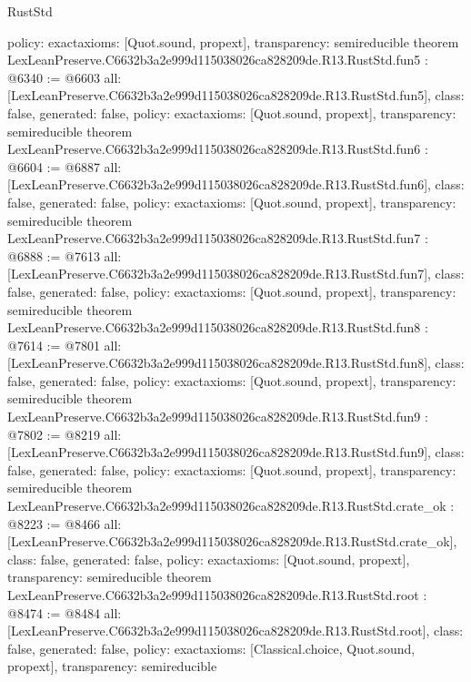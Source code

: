 \begin{lexlean}{RustStd}
\begin{coremodule}
{  policy: exact{axioms: [Quot.sound, propext]},
  transparency: semireducible
}
theorem LexLeanPreserve.C6632b3a2e999d115038026ca828209de.R13.RustStd.fun5 : @6340 := @6603 {
  all: [LexLeanPreserve.C6632b3a2e999d115038026ca828209de.R13.RustStd.fun5],
  class: false,
  generated: false,
  policy: exact{axioms: [Quot.sound, propext]},
  transparency: semireducible
}
theorem LexLeanPreserve.C6632b3a2e999d115038026ca828209de.R13.RustStd.fun6 : @6604 := @6887 {
  all: [LexLeanPreserve.C6632b3a2e999d115038026ca828209de.R13.RustStd.fun6],
  class: false,
  generated: false,
  policy: exact{axioms: [Quot.sound, propext]},
  transparency: semireducible
}
theorem LexLeanPreserve.C6632b3a2e999d115038026ca828209de.R13.RustStd.fun7 : @6888 := @7613 {
  all: [LexLeanPreserve.C6632b3a2e999d115038026ca828209de.R13.RustStd.fun7],
  class: false,
  generated: false,
  policy: exact{axioms: [Quot.sound, propext]},
  transparency: semireducible
}
theorem LexLeanPreserve.C6632b3a2e999d115038026ca828209de.R13.RustStd.fun8 : @7614 := @7801 {
  all: [LexLeanPreserve.C6632b3a2e999d115038026ca828209de.R13.RustStd.fun8],
  class: false,
  generated: false,
  policy: exact{axioms: [Quot.sound, propext]},
  transparency: semireducible
}
theorem LexLeanPreserve.C6632b3a2e999d115038026ca828209de.R13.RustStd.fun9 : @7802 := @8219 {
  all: [LexLeanPreserve.C6632b3a2e999d115038026ca828209de.R13.RustStd.fun9],
  class: false,
  generated: false,
  policy: exact{axioms: [Quot.sound, propext]},
  transparency: semireducible
}
theorem LexLeanPreserve.C6632b3a2e999d115038026ca828209de.R13.RustStd.crate_ok : @8223 := @8466 {
  all: [LexLeanPreserve.C6632b3a2e999d115038026ca828209de.R13.RustStd.crate_ok],
  class: false,
  generated: false,
  policy: exact{axioms: [Quot.sound, propext]},
  transparency: semireducible
}
theorem LexLeanPreserve.C6632b3a2e999d115038026ca828209de.R13.RustStd.root : @8474 := @8484 {
  all: [LexLeanPreserve.C6632b3a2e999d115038026ca828209de.R13.RustStd.root],
  class: false,
  generated: false,
  policy: exact{axioms: [Classical.choice, Quot.sound, propext]},
  transparency: semireducible
}


\end{coremodule}
\end{lexlean}
